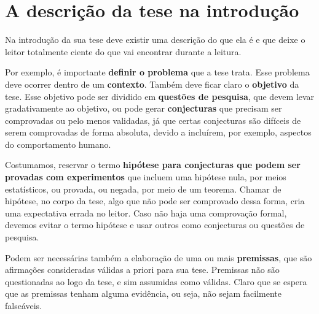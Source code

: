 \section{A descrição da tese na introdução}

Na introdução da sua tese deve existir uma descrição do que ela é e que deixe o leitor totalmente ciente do que vai encontrar durante a leitura.

Por exemplo, é importante \textbf{definir o problema} que a tese trata. Esse problema deve ocorrer dentro de um \textbf{contexto}. Também deve ficar claro o \textbf{objetivo} da tese. Esse objetivo pode ser dividido em \textbf{questões de pesquisa}, que devem levar gradativamente ao objetivo, ou pode gerar \textbf{conjecturas} que precisam ser comprovadas ou pelo menos validadas, já que certas conjecturas são difíceis de serem comprovadas de forma absoluta, devido a incluírem, por exemplo, aspectos do comportamento humano.

Costumamos, reservar o termo \textbf{hipótese para conjecturas que podem ser provadas com experimentos} que incluem uma hipótese nula, por meios estatísticos, ou provada, ou negada, por meio de um teorema. Chamar de hipótese, no corpo da tese, algo que não pode ser comprovado dessa forma, cria uma expectativa errada no leitor. Caso não haja uma comprovação formal, devemos evitar o termo hipótese e usar outros como conjecturas ou questões de pesquisa.

Podem ser necessárias também a elaboração de uma ou mais \textbf{premissas}, que são afirmações consideradas válidas a priori para sua tese. Premissas não são questionadas ao logo da tese, e sim assumidas como válidas. Claro que se espera que as premissas tenham alguma evidência, ou seja, não sejam facilmente falseáveis.
